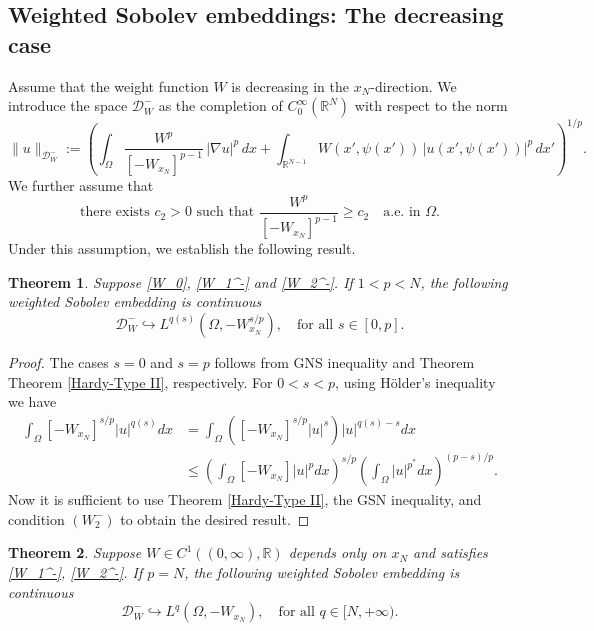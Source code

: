 \documentclass[12pt]{amsart}
\newtheorem{theorem}{Theorem}[section]
\theoremstyle{definition}
\theoremstyle{plain}
\begin{document}
\subsection{Weighted Sobolev embeddings: The decreasing case}
Assume that the weight function $W$ is decreasing in the $x_N$-direction. We introduce the space $\mathcal{D}_W^-$ as the completion of $C_0^\infty(\mathbb{R}^N)$ with respect to the norm
\[
\|u\|_{\mathcal{D}_W^-}
:=\left(
\int_\Omega \frac{W^p}{[-W_{x_N}]^{p-1}}\,|\nabla u|^p \, dx
+\int_{\mathbb{R}^{N-1}} W(x',\psi(x'))\,|u(x',\psi(x'))|^p \, dx'
\right)^{1/p}.
\]
We further assume that
\begin{equation} \label{W_2^-} \tag{$W_2^-$}
\text{there exists } c_2>0 \text{ such that } 
\frac{W^p}{[-W_{x_N}]^{p-1}} \geq c_2 \quad \text{a.e. in } \Omega.
\end{equation}
Under this assumption, we establish the following result.


\begin{theorem}\label{Sobolev negative} Suppose \eqref{W_0}, \eqref{W_1^-} and \eqref{W_2^-}. If  $1<p<N$,  
the following weighted Sobolev embedding is continuous
  $$
  \mathcal{D}_W^- \hookrightarrow L^{q(s)}(\Omega,-W_{x_N}^{s/p}),  \quad \text{for all } s \in [0,p].
  $$
\end{theorem}

\begin{proof}
The cases $s=0$ and $s=p$ follows from GNS inequality and Theorem Theorem \ref{Hardy-Type II}, respectively.
For $0<s<p$, using H\"older's inequality we have 
$$
\begin{aligned}
\int_\Omega [-W_{x_N}]^{s/p}|u|^{q(s)}dx & =\int_\Omega ([-W_{x_N}]^{s/p}|u|^s)|u|^{q(s)-s}dx 
 \\ & \leq\left(\int_\Omega [-W_{x_N}]|u|^pdx\right)^{s/p}\left(\int_\Omega|u|^{p^*}dx\right)^{(p-s)/p}.
\end{aligned}
$$
Now it is sufficient to use  Theorem \ref{Hardy-Type II},  the GSN inequality, and condition $(W_2^-)$ to obtain the desired result. 
\end{proof}

\begin{theorem}\label{Sobolev negative-borderline} Suppose $W\in C^1((0,\infty),\mathbb{R})$ depends only on $x_N$ and  satisfies  \eqref{W_1^-},  \eqref{W_2^-}. If  $p=N$,  
the following weighted Sobolev embedding is continuous
 $$
    \mathcal{D}_W^- \hookrightarrow L^q(\Omega,-W_{x_N}),  \quad \text{for all } q \in [N,+\infty).
    $$
\end{theorem}
\end{document}
